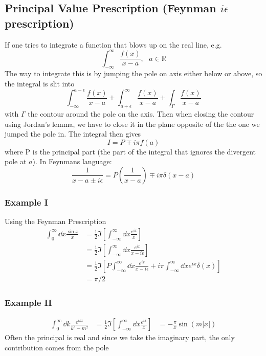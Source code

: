 \documentclass[a4paper,12pt]{article}
\begin{document}
\subsection{Principal Value Prescription (Feynman $i\epsilon$ prescription)}
If one tries to integrate a function that blows up on the real line, e.g.
\begin{equation}
\int_{-\infty}^{\infty}\frac{f(x)}{x-a}, ~~~ a\in \mathds{R}
\end{equation}
The way to integrate this is by jumping the pole on axis either below or above, so the integral is slit into
\begin{equation}
	\int_{-\infty}^{a-\epsilon}\frac{f(x)}{x-a}+\int_{a+\epsilon}^{\infty}\frac{f(x)}{x-a}+\int_\Gamma\frac{f(x)}{x-a}
\end{equation}
with $\Gamma$ the contour around the pole on the axis. Then when closing the contour using Jordan's lemma, we have to close it in the plane opposite of the the one we jumped the pole in.
The integral then gives
\begin{equation}
I = P\mp i \pi f(a)
\end{equation}
where P is the principal part (the part of the integral that ignores the divergent pole at $a$). In Feynmans language:
\begin{equation}
\frac{1}{x-a\pm i\epsilon}=P(\frac{1}{x-a})\mp i \pi\delta(x-a)
\end{equation}
\subsubsection{Example I}
Using the Feynman Prescription
\begin{equation}
\begin{aligned}
 \int_{0}^{\infty} \dd x\frac{\sin x}{x} &=\frac{1}{2}\Im\left[ \int_{-\infty}^{\infty} \dd x\frac{e^{ix}}{x}\right]\\
 &=\frac{1}{2}\Im\left[ \int_{-\infty}^{\infty} \dd x\frac{e^{ix}}{x-i\epsilon}\right]\\
  &=\frac{1}{2}\Im\left[P \int_{-\infty}^{\infty} \dd x\frac{e^{ix}}{x-i\epsilon}+i\pi \int_{-\infty}^{\infty} \dd x e^{ix}\delta(x)\right]\\
  &=\pi/2
\end{aligned}
\end{equation}
\subsubsection{Example II}
\begin{equation}
	\begin{aligned}
		\int_{0}^{\infty} \dd k\frac{e^{ikx}}{k^2-m^2} &=\frac{1}{2}\Im\left[ \int_{-\infty}^{\infty} \dd x\frac{e^{ix}}{x}\right]
		&=-\frac{\pi}{x}\sin(m|x|)
	\end{aligned}
\end{equation}
Often the principal is real and since we take the imaginary part, the only contribution comes from the pole 
\end{document}
